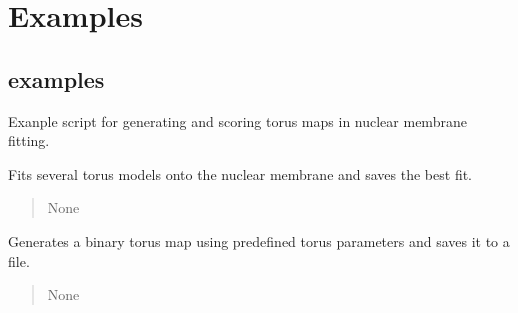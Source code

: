 \documentclass[letterpaper,10pt,english]{sphinxmanual}
\begin{document}
\sphinxstepscope


\section{Examples}
\label{\detokenize{examples:examples}}\label{\detokenize{examples::doc}}

\subsection{examples}
\label{\detokenize{examples:id1}}\label{\detokenize{examples:module-examples.examples}}
\sphinxAtStartPar
Exanple script for generating and scoring torus maps in nuclear membrane fitting.

\begin{fulllineitems}
\label{\detokenize{examples:examples.examples.generate_bestfit_torus_map}}
\pysigstartsignatures
{}
\pysigstopsignatures
\sphinxAtStartPar
Fits several torus models onto the nuclear membrane and saves the best fit.
\begin{quote}\begin{description}
\sphinxAtStartPar
None

\end{description}\end{quote}

\end{fulllineitems}


\begin{fulllineitems}
\label{\detokenize{examples:examples.examples.generate_binary_torus_map}}
\pysigstartsignatures
{}
\pysigstopsignatures
\sphinxAtStartPar
Generates a binary torus map using predefined torus parameters and saves it to a file.
\begin{quote}\begin{description}
\sphinxAtStartPar
None

\end{description}\end{quote}

\end{fulllineitems}
\end{document}
